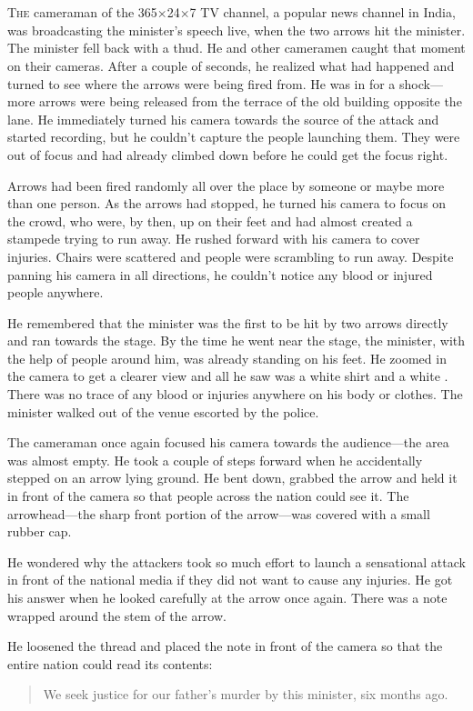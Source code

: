\chapter{}

\lettrine{T}{he} cameraman of the 365×24×7 TV channel, a popular news channel in
India, was broadcasting the minister's speech live, when
the two arrows hit the minister. The minister fell back with a thud. He and
other cameramen caught that moment on their cameras. After a couple of seconds,
he realized what had happened and turned to see where the arrows were being fired
from.  He was in for a shock—more arrows were being released from the terrace of
the old building opposite the lane. He immediately turned his camera towards the
source of the attack and started recording, but he couldn't capture the people
launching them. They were out of focus and had already climbed down before he
could get the focus right.

Arrows had been fired randomly all over the place by someone or maybe more than one
person. As the arrows had stopped, he turned his camera to focus on the crowd, who
were, by then, up on their feet and had almost created a stampede trying to run
away. He rushed forward with his camera to cover injuries. Chairs were scattered
and people were scrambling to run away. Despite panning his camera in all
directions, he couldn't notice any blood or injured people anywhere.

He remembered that the minister was the first to be hit by two arrows directly
and ran towards the stage. By the time he went near the stage, the minister,
with the help of people around him, was already standing on his feet. He zoomed
in the camera to get a clearer view and all he saw was a white shirt and a white
. There was no trace of any blood or injuries anywhere on his
body or clothes. The minister walked out of the venue escorted by the police.

The cameraman once again focused his camera towards the audience—the area was
almost empty. He took a couple of steps forward when he accidentally stepped on
an arrow lying ground. He bent down, grabbed the arrow and held it in
front of the camera so that people across the nation could see it. The
arrowhead—the sharp front portion of the arrow—was covered with a small rubber
cap.

He wondered why the attackers took so much effort to launch a sensational attack
in front of the national media if they did not want to cause any injuries. He
got his answer when he looked carefully at the arrow once again. There was a
note wrapped around the stem of the arrow.

He loosened the thread and placed the note in front of the camera so that the
entire nation could read its contents:
\begin{quote}
    We seek justice for our father's murder by this minister, six months ago.
\end{quote}